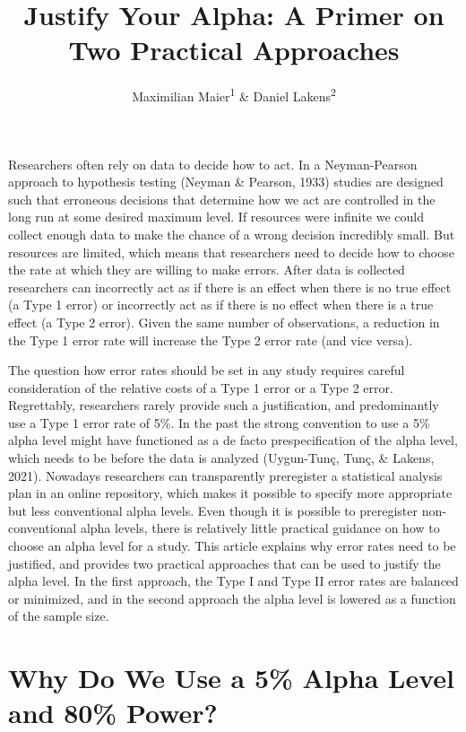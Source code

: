 \documentclass[
  english,
  ,jou, a4paper,floatsintext]{apa6}
\title{Justify Your Alpha: A Primer on Two Practical Approaches}
\author{Maximilian Maier\textsuperscript{1} \& Daniel Lakens\textsuperscript{2}}
\date{}
\affiliation{\vspace{0.5cm}\textsuperscript{1} University of Amsterdam, The Netherlands\\\textsuperscript{2} Eindhoven University of Technology, The Netherlands}
\begin{document}
\maketitle

Researchers often rely on data to decide how to act. In a Neyman-Pearson approach to hypothesis testing (Neyman \& Pearson, 1933) studies are designed such that erroneous decisions that determine how we act are controlled in the long run at some desired maximum level. If resources were infinite we could collect enough data to make the chance of a wrong decision incredibly small. But resources are limited, which means that researchers need to decide how to choose the rate at which they are willing to make errors. After data is collected researchers can incorrectly act as if there is an effect when there is no true effect (a Type 1 error) or incorrectly act as if there is no effect when there is a true effect (a Type 2 error). Given the same number of observations, a reduction in the Type 1 error rate will increase the Type 2 error rate (and vice versa).

The question how error rates should be set in any study requires careful consideration of the relative costs of a Type 1 error or a Type 2 error. Regrettably, researchers rarely provide such a justification, and predominantly use a Type 1 error rate of 5\%. In the past the strong convention to use a 5\% alpha level might have functioned as a de facto prespecification of the alpha level, which needs to be before the data is analyzed (Uygun-Tunç, Tunç, \& Lakens, 2021). Nowadays researchers can transparently preregister a statistical analysis plan in an online repository, which makes it possible to specify more appropriate but less conventional alpha levels. Even though it is possible to preregister non-conventional alpha levels, there is relatively little practical guidance on how to choose an alpha level for a study. This article explains why error rates need to be justified, and provides two practical approaches that can be used to justify the alpha level. In the first approach, the Type I and Type II error rates are balanced or minimized, and in the second approach the alpha level is lowered as a function of the sample size.

\hypertarget{why-do-we-use-a-5-alpha-level-and-80-power}{%
\section{Why Do We Use a 5\% Alpha Level and 80\% Power?}\label{why-do-we-use-a-5-alpha-level-and-80-power}}
\end{document}
